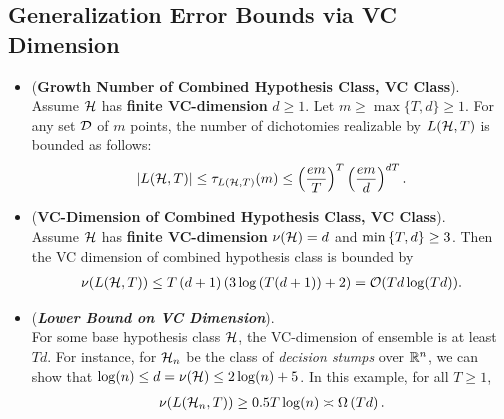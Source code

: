 \documentclass[11pt]{article}
\begin{document}
\subsection{Generalization Error Bounds via VC Dimension}
\begin{itemize}
\item \begin{lemma} (\textbf{Growth Number of Combined Hypothesis Class, VC Class}). \citep{schapire2012boosting}\\
Assume ${\mathcal H}$ has \textbf{finite VC-dimension} $d \ge 1$. Let $m \ge \max\{T, d\} \ge 1$. For any set ${\mathcal D}$ of $m$ points, the number of dichotomies realizable by $L({\mathcal H}, T)$ is bounded as follows:
\begin{align}
\left\lvert L({\mathcal H}, T) \right\rvert \le \tau_{L({\mathcal H}, T)}(m) \le \left(\frac{em}{T}\right)^T \left(\frac{em}{d}\right)^{dT}.  \label{ineqn: growth_fun_ensemble_infinite}
\end{align}
\end{lemma}

\item \begin{lemma} (\textbf{VC-Dimension of Combined Hypothesis Class, VC Class}). \citep{schapire2012boosting, shalev2014understanding}\\
Assume ${\mathcal H}$ has \textbf{finite VC-dimension} $\nu({\mathcal H}) = d$ and $\min\left\{T, d\right\} \ge 3$. Then the VC dimension of combined hypothesis class is bounded by
\begin{align}
\nu(L({\mathcal H}, T)) \le T\left(d + 1\right)\left(3\log\left(T(d+1)\right) + 2\right) = {\mathcal O}(Td \log(Td)).  \label{ineqn: vc_dim_ensemble_infinite}
\end{align}
\end{lemma}

\item \begin{remark}(\textbf{\emph{Lower Bound on VC Dimension}}). \citep{shalev2014understanding}\\
For some base hypothesis class ${\mathcal H}$, the VC-dimension of ensemble is at least $Td$. For instance, for ${\mathcal H}_n$  be the class of \emph{decision stumps} over ${\mathbb R}^n$,  we can show that $\log(n) \le d = \nu({\mathcal H}) \le 2\log(n) + 5$.  In this example, for all $T \ge 1$, 
\begin{align*}
\nu(L({\mathcal H}_n, T)) \ge 0.5T\log(n) \asymp \Omega\left(Td\right).
\end{align*} 
\end{remark}


\end{itemize}
\end{document}

